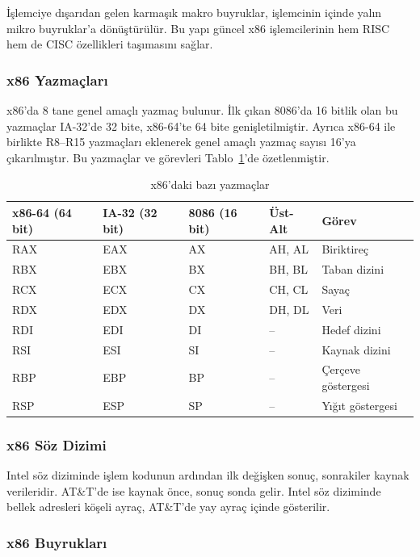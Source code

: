 İşlemciye dışarıdan gelen karmaşık makro buyruklar, işlemcinin içinde yalın mikro buyruklar'a dönüştürülür. Bu yapı güncel x86 işlemcilerinin hem RISC hem de CISC özellikleri taşımasını sağlar.

\subsubsection{x86 Yazmaçları}

x86'da 8 tane genel amaçlı yazmaç bulunur. İlk çıkan 8086'da 16 bitlik olan bu yazmaçlar IA-32'de 32 bite, x86-64'te 64 bite genişletilmiştir. Ayrıca x86-64 ile birlikte R8--R15 yazmaçları eklenerek genel amaçlı yazmaç sayısı 16'ya çıkarılmıştır. Bu yazmaçlar ve görevleri Tablo~\ref{tab:x86-yazmaclar}'de özetlenmiştir.

\begin{table}[H]
\centering
\caption{x86'daki bazı yazmaçlar}
\label{tab:x86-yazmaclar}
\small
\begin{tabular}{lllll}
\toprule
\textbf{x86-64 (64 bit)} & \textbf{IA-32 (32 bit)} & \textbf{8086 (16 bit)} & \textbf{Üst-Alt} & \textbf{Görev} \\
\midrule
RAX & EAX & AX & AH, AL & Biriktireç \\
RBX & EBX & BX & BH, BL & Taban dizini \\
RCX & ECX & CX & CH, CL & Sayaç \\
RDX & EDX & DX & DH, DL & Veri \\
RDI & EDI & DI & --     & Hedef dizini \\
RSI & ESI & SI & --     & Kaynak dizini \\
RBP & EBP & BP & --     & Çerçeve göstergesi \\
RSP & ESP & SP & --     & Yığıt göstergesi \\
\bottomrule
\end{tabular}
\end{table}

\subsubsection{x86 Söz Dizimi}

Intel söz diziminde işlem kodunun ardından ilk değişken sonuç, sonrakiler kaynak verileridir. AT\&T'de ise kaynak önce, sonuç sonda gelir. Intel söz diziminde bellek adresleri köşeli ayraç, AT\&T'de yay ayraç içinde gösterilir.

\subsubsection{x86 Buyrukları}

